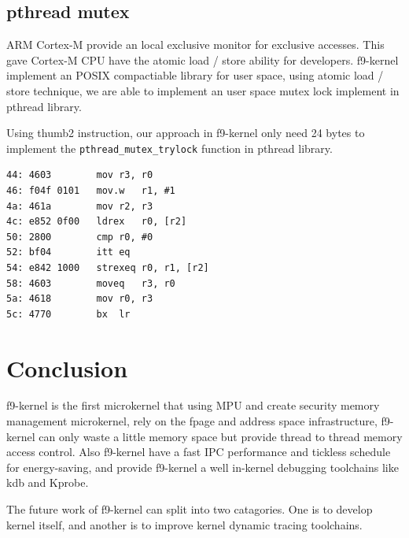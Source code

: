 \documentclass[10pt,preprint,nocopyrightspace]{sigplanconf}
\begin{document}
\subsection{pthread mutex}
ARM Cortex-M provide an local exclusive monitor for exclusive accesses. This gave Cortex-M CPU have the atomic load / store ability for developers\cite{arm2012v7}. f9-kernel implement an POSIX compactiable library for user space, using atomic load / store technique, we are able to implement an user space mutex lock implement in pthread library.

Using thumb2 instruction, our approach in f9-kernel only need 24 bytes to implement the \texttt{pthread\_mutex\_trylock} function in pthread library.

\begin{lstlisting}[basicstyle=\small,frame=single]
44:	4603      	mov	r3, r0
46:	f04f 0101 	mov.w	r1, #1
4a:	461a      	mov	r2, r3
4c:	e852 0f00 	ldrex	r0, [r2]
50:	2800      	cmp	r0, #0
52:	bf04      	itt	eq
54:	e842 1000 	strexeq	r0, r1, [r2]
58:	4603      	moveq	r3, r0
5a:	4618      	mov	r0, r3
5c:	4770      	bx	lr
\end{lstlisting}

\section{Conclusion}
f9-kernel is the first microkernel that using MPU and create security memory management microkernel, rely on the fpage and address space infrastructure, f9-kernel can only waste a little memory space but provide thread to thread memory access control. Also f9-kernel have a fast IPC performance and tickless schedule for energy-saving, and provide f9-kernel a well in-kernel debugging toolchains like kdb and Kprobe.

The future work of f9-kernel can split into two catagories. One is to develop kernel itself, and another is to improve kernel dynamic tracing toolchains.


\end{document}
